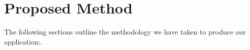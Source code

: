 \documentclass[sigconf,nonacm,11pt]{acmart}
\begin{document}





\section{Proposed Method}
The following sections outline the methodology we have taken to produce our application:.\vspace{-0.5em}
\end{document}
